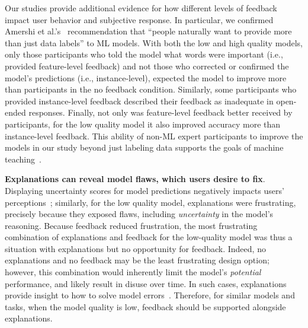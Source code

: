Our studies provide additional evidence for how different levels of feedback impact user behavior and subjective response. In particular, we confirmed Amershi et al.'s~\cite{Amershi2014PowerLearning} recommendation that ``people naturally want to provide more than just data labels'' to ML models. 
%
With both the low and high quality models, only those participants who told the model what words were important (i.e., provided feature-level feedback) and not those who corrected or confirmed the model's predictions (i.e., instance-level), expected the model to improve more than participants in the no feedback condition. Similarly, some participants who provided instance-level feedback described their feedback as inadequate in open-ended responses.
%
Finally, not only was feature-level feedback better received by participants, for the low quality model it also improved accuracy more than instance-level feedback.
This ability of non-ML expert participants to improve the models in our study beyond just labeling data supports the goals of machine teaching~\cite{Wall2019UsingTeaching}.  


\textbf{Explanations can reveal model flaws, which users desire to fix}. 
Displaying uncertainty scores for model predictions negatively impacts users' perceptions~\cite{Lim2011InvestigatingApplications}; similarly, for the low quality model, explanations were frustrating, precisely because they exposed flaws, including \textit{uncertainty} in the model's reasoning.
Because feedback reduced frustration, the most frustrating combination of explanations and feedback for the low-quality model was thus a situation with explanations but no opportunity for feedback. Indeed, no explanations and no feedback may be the least frustrating design option; however, this combination would inherently limit the model's \textit{potential} performance, and likely result in disuse over time.
In such cases, explanations provide insight to how to solve model errors~\cite{Kulesza2015PrinciplesLearning}. Therefore, for similar models and tasks, when the model quality is low, feedback should be supported alongside explanations.

